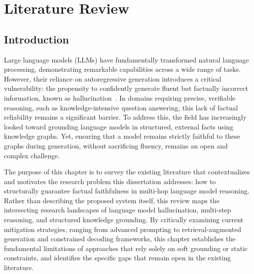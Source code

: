 
\chapter{Literature Review}

\section{Introduction}

Large language models (LLMs) have fundamentally transformed natural language processing, demonstrating remarkable capabilities across a wide range of tasks. However, their reliance on autoregressive generation introduces a critical vulnerability: the propensity to confidently generate fluent but factually incorrect information, known as hallucination~\citep{ji2023survey}. In domains requiring precise, verifiable reasoning, such as knowledge-intensive question answering, this lack of factual reliability remains a significant barrier. To address this, the field has increasingly looked toward grounding language models in structured, external facts using knowledge graphs. Yet, ensuring that a model remains strictly faithful to these graphs during generation, without sacrificing fluency, remains an open and complex challenge.

The purpose of this chapter is to survey the existing literature that contextualizes and motivates the research problem this dissertation addresses: how to structurally guarantee factual faithfulness in multi-hop language model reasoning. Rather than describing the proposed system itself, this review maps the intersecting research landscapes of language model hallucination, multi-step reasoning, and structured knowledge grounding. By critically examining current mitigation strategies, ranging from advanced prompting to retrieval-augmented generation and constrained decoding frameworks, this chapter establishes the fundamental limitations of approaches that rely solely on soft grounding or static constraints, and identifies the specific gaps that remain open in the existing literature.

